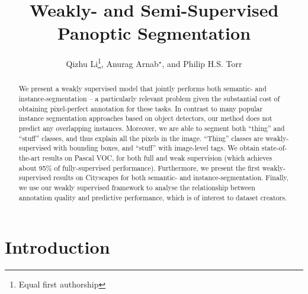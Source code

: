 \documentclass[runningheads]{llncs}
\begin{document}
\pagestyle{headings}
\mainmatter
\def\ECCV14SubNumber{95}  

\title{Weakly- and Semi-Supervised Panoptic Segmentation} 



\author{Qizhu Li\thanks{Equal first authorship}, Anurag Arnab$ ^{\star}$, and Philip H.S. Torr} 


\maketitle

\begin{abstract}
We present a weakly supervised model that jointly performs both semantic- and instance-segmentation -- a particularly relevant problem given the substantial cost of obtaining pixel-perfect annotation for these tasks.
In contrast to many popular instance segmentation approaches based on object detectors, our method does not predict any overlapping instances.
Moreover, we are able to segment both ``thing'' and ``stuff'' classes, and thus explain all the pixels in the image.
``Thing'' classes are weakly-supervised with bounding boxes, and ``stuff'' with image-level tags.
We obtain state-of-the-art results on Pascal VOC, for both full and weak supervision (which achieves about 95\% of fully-supervised performance).
Furthermore, we present the first weakly-supervised results on Cityscapes for both semantic- and instance-segmentation.
Finally, we use our weakly supervised framework to analyse the relationship between annotation quality and predictive performance, which is of interest to dataset creators.

\end{abstract} 


\section{Introduction}
\end{document}
